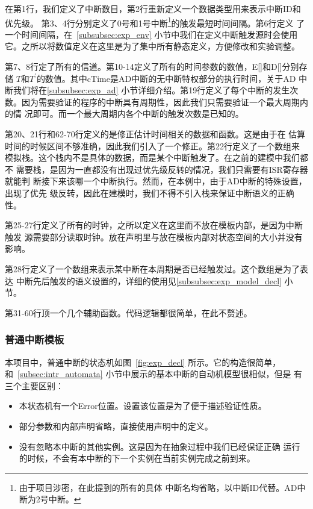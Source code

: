 在第1行，我们定义了中断数目，第2行重新定义一个数据类型用来表示中断ID和优先级。
第3、4行分别定义了0号和1号中断\footnote{由于项目涉密，在此提到的所有的具体
中断名均省略，以中断ID代替。AD中断为2号中断。}的触发最短时间间隔。第6行定义
了一个时间间隔，在~\ref{subsubsec:exp_env} 小节中我们在定义中断触发源时会使用
它。之所以将数值定义在这里是为了集中所有静态定义，方便修改和实验调整。

第7、8行定了所有的信道。第10-14定义了所有的时间参数的数值，E[]和D[]分别存储
$T$和$T^\prime$的数值。其中cTime是AD中断的无中断特权部分的执行时间，关于AD
中断我们将在\ref{subsubsec:exp_ad} 小节详细介绍。第19行定义了每个中断的发生次
数。因为需要验证的程序的中断具有周期性，因此我们只需要验证一个最大周期内的情
况即可。而一个最大周期内各个中断的触发次数是已知的。

第20、21行和62-70行定义的是修正估计时间相关的数据和函数。这是由于\uppaal 在
估算时间的时候区间不够准确，因此我们引入了一个修正。第22行定义了一个数组来
模拟栈。这个栈内不是具体的数据，而是某个中断触发了。在之前的建模中我们都不
需要栈，是因为一直都没有出现过优先级反转的情况，我们只需要有ISR寄存器就能判
断接下来该哪一个中断执行。然而，在本例中，由于AD中断的特殊设置，出现了优先
级反转，因此在建模时，我们不得不引入栈来保证中断语义的正确性。

第25-27行定义了所有的时钟，之所以定义在这里而不放在模板内部，是因为中断触发
源需要部分读取时钟。放在声明里与放在模板内部对状态空间的大小并没有影响。

第28行定义了一个数组来表示某中断在本周期是否已经触发过。这个数组是为了表达
中断先后触发的语义设置的，详细的使用见\ref{subsubsec:exp_model_decl} 小节。

第31-60行顶一个几个辅助函数。代码逻辑都很简单，在此不赘述。

\subsubsection{普通中断模板}
\label{subsubsec:exp_intr}

本项目中，普通中断的状态机如图~\ref{fig:exp_decl} 所示。它的构造很简单，
和~\ref{subsec:intr_automata} 小节中展示的基本中断的自动机模型很相似，但是
有三个主要区别：

\begin{itemize}
	\item 本状态机有一个Error位置。设置该位置是为了便于描述验证性质。
	\item 部分参数和内部声明省略，直接使用声明中的定义。
	\item 没有忽略本中断的其他实例。这是因为在抽象过程中我们已经保证正确
	运行的时候，不会有本中断的下一个实例在当前实例完成之前到来。
\end{itemize}

